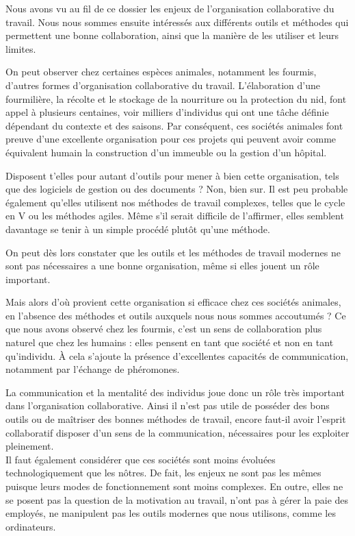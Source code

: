 
Nous avons vu au fil de ce dossier les enjeux de l'organisation collaborative du travail. Nous nous sommes ensuite intéressés aux différents outils et méthodes qui permettent une bonne collaboration, ainsi que la manière de les utiliser et leurs limites.

On peut observer chez certaines espèces animales, notamment les fourmis, d'autres formes d'organisation collaborative du travail. L'élaboration d'une fourmilière, la récolte et le stockage de la nourriture ou la protection du nid, font appel à plusieurs centaines, voir milliers d'individus qui ont une tâche définie dépendant du contexte et des saisons. Par conséquent, ces sociétés animales font preuve d'une excellente organisation pour ces projets qui peuvent avoir comme équivalent humain la construction d'un immeuble ou la gestion d'un hôpital.

Disposent t'elles pour autant d'outils pour mener à bien cette organisation, tels que des logiciels de gestion ou des documents ? Non, bien sur. Il est peu probable également qu'elles utilisent nos méthodes de travail complexes, telles que le cycle en V ou les méthodes agiles. Même s'il serait difficile de l'affirmer, elles semblent davantage se tenir à un simple procédé plutôt qu'une méthode.

On peut dès lors constater que les outils et les méthodes de travail modernes ne sont pas nécessaires a une bonne organisation, même si elles jouent un rôle important.

Mais alors d'où provient cette organisation si efficace chez ces sociétés animales, en l'absence des méthodes et outils auxquels nous nous sommes accoutumés ? Ce que nous avons observé chez les fourmis, c'est un sens de collaboration plus naturel que chez les humains : elles pensent en tant que société et non en tant qu'individu. À cela s'ajoute la présence d'excellentes capacités de communication, notamment par l'échange de phéromones.

La communication et la mentalité des individus joue donc un rôle très important dans l'organisation collaborative. Ainsi il n'est pas utile de posséder des bons outils ou de maîtriser des bonnes méthodes de travail, encore faut-il avoir l'esprit collaboratif disposer d'un sens de la communication, nécessaires pour les exploiter pleinement.\\

Il faut également considérer que ces sociétés sont moins évoluées technologiquement que les nôtres. De fait, les enjeux ne sont pas les mêmes puisque leurs modes de fonctionnement sont moins complexes. En outre, elles ne se posent pas la question de la motivation au travail, n'ont pas à gérer la paie des employés, ne manipulent pas les outils modernes que nous utilisons, comme les ordinateurs.

